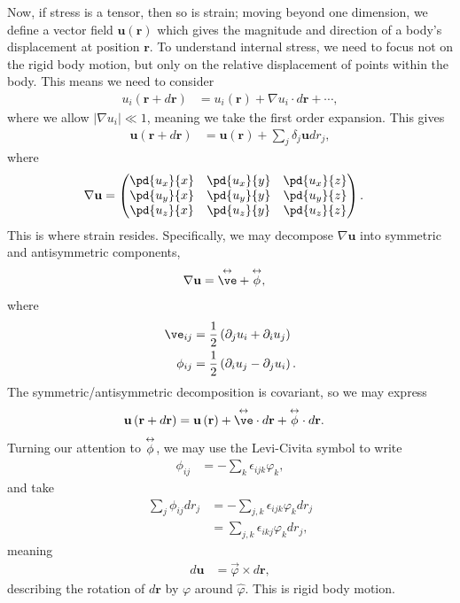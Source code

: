 \documentclass[10pt]{mypackage}
\newcommand{\doublevec}[1]{\overset{\scriptsize \leftrightarrow}{#1}}
\begin{document}
  Now, if stress is a tensor, then so is strain; moving beyond one dimension, we define a vector field $\mathbf{u}\left( \mathbf{r} \right)$ which gives the magnitude and direction of a body's displacement at position $\mathbf{r}$. To understand internal stress, we need to focus not on the rigid body motion, but only on the relative displacement of points within the body. This means we need to consider
  \begin{align*}
    u_i\left( \mathbf{r} + d\mathbf{r} \right) &= u_i\left( \mathbf{r} \right) + \nabla u_i \cdot d\mathbf{r} + \cdots,
  \end{align*}
  where we allow $\left\vert \nabla u_i \right\vert \ll 1$, meaning we take the first order expansion. This gives
  \begin{align*}
    \mathbf{u}\left( \mathbf{r} + d\mathbf{r} \right) &= \mathbf{u}\left( \mathbf{r} \right) + \sum_{j} \delta_j \mathbf{u}dr_j,
  \end{align*}
  where
  \begin{align*}
    \nabla \mathbf{u} &= \begin{pmatrix} \pd{u_x}{x} & \pd{u_x}{y} & \pd{u_x}{z} \\ \pd{u_y}{x} & \pd{u_y}{y} & \pd{u_y}{z} \\ \pd{u_z}{x} & \pd{u_z}{y} & \pd{u_z}{z}\end{pmatrix}.
  \end{align*}
  This is where strain resides. Specifically, we may decompose $\nabla \mathbf{u}$ into symmetric and antisymmetric components,
  \begin{align*}
    \nabla \mathbf{u} &= \doublevec{\ve} + \doublevec{\phi},
  \end{align*}
  where
  \begin{align*}
    \ve_{ij} &= \frac{1}{2}\left( \partial_ju_i + \partial_iu_j \right)\\
    \phi_{ij} &= \frac{1}{2}\left( \partial_iu_j - \partial_ju_i \right).
  \end{align*}
  The symmetric/antisymmetric decomposition is covariant, so we may express
  \begin{align*}
    \mathbf{u}\left( \mathbf{r} + d\mathbf{r} \right) &= \mathbf{u}\left( \mathbf{r} \right) + \doublevec{\ve}\cdot d\mathbf{r} + \doublevec{\phi}\cdot d\mathbf{r}.
  \end{align*}
  Turning our attention to $\doublevec{\phi}$, we may use the Levi-Civita symbol to write
  \begin{align*}
    \phi_{ij} &= -\sum_{k} \epsilon_{ijk}\varphi_k,
  \end{align*}
  and take
  \begin{align*}
    \sum_{j}\phi_{ij}dr_j &= -\sum_{j,k} \epsilon_{ijk}\varphi_kdr_j\\
                          &= \sum_{j,k}\epsilon_{ikj}\varphi_kdr_j,
  \end{align*}
  meaning
  \begin{align*}
    d\mathbf{u} &= \vec{\varphi}\times d\mathbf{r},
  \end{align*}
  describing the rotation of $d\mathbf{r}$ by $\varphi$ around $\hat{\varphi}$. This is rigid body motion.\newline
\end{document}
